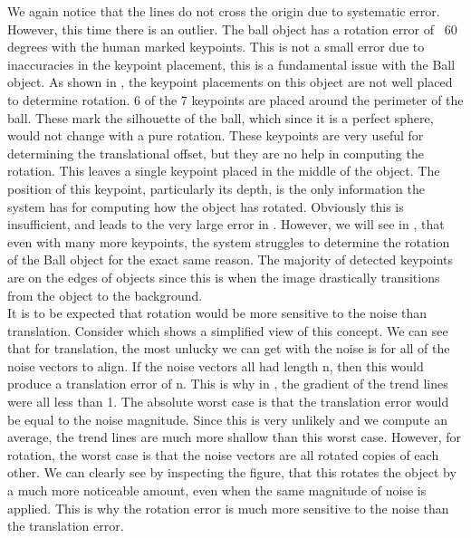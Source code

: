 We again notice that the lines do not cross the origin due to systematic error. However, this time there is an outlier. The ball object has a rotation error of ~60 degrees with the human marked keypoints. This is not a small error due to inaccuracies in the keypoint placement, this is a fundamental issue with the Ball object. As shown in , the keypoint placements on this object are not well placed to determine rotation. 6 of the 7 keypoints are placed around the perimeter of the ball. These mark the silhouette of the ball, which since it is a perfect sphere, would not change with a pure rotation. These keypoints are very useful for determining the translational offset, but they are no help in computing the rotation. This leaves a single keypoint placed in the middle of the object. The position of this keypoint, particularly its depth, is the only information the system has for computing how the object has rotated. Obviously this is insufficient, and leads to the very large error in . However, we will see in , that even with many more keypoints, the system struggles to determine the rotation of the Ball object for the exact same reason. The majority of detected keypoints are on the edges of objects since this is when the image drastically transitions from the object to the background.\\

It is to be expected that rotation would be more sensitive to the noise than translation. Consider  which shows a simplified view of this concept. We can see that for translation, the most unlucky we can get with the noise is for all of the noise vectors to align. If the noise vectors all had length n, then this would produce a translation error of n. This is why in , the gradient of the trend lines were all less than 1. The absolute worst case is that the translation error would be equal to the noise magnitude. Since this is very unlikely and we compute an average, the trend lines are much more shallow than this worst case. However, for rotation, the worst case is that the noise vectors are all rotated copies of each other. We can clearly see by inspecting the figure, that this rotates the object by a much more noticeable amount, even when the same magnitude of noise is applied. This is why the rotation error is much more sensitive to the noise than the translation error.

